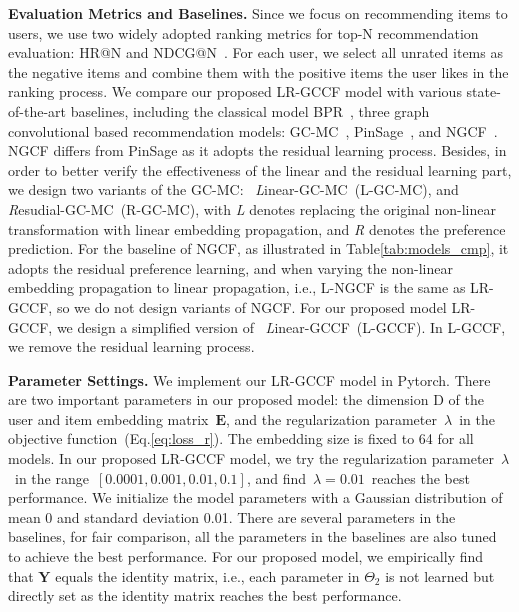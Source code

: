 \documentclass[letterpaper]{article} %
\newcommand{\Mat}[1]{\mathbf{#1}}
\begin{document}
\textbf{Evaluation Metrics and Baselines.}
Since we focus on recommending items to users, we use two widely adopted ranking metrics for top-N recommendation evaluation: HR@N and NDCG@N~\cite{chen2017attentive}. For each user, we select all unrated items as the negative items and combine them with the positive items the user likes in the ranking process. We compare our proposed LR-GCCF model with various state-of-the-art baselines, including the classical model BPR~\cite{UAI2009bpr}, three graph convolutional based recommendation models: GC-MC~\cite{ICLR2017graph}, PinSage~\cite{kdd2018Pinsage}, and NGCF~\cite{sigir2019ngcf}. NGCF differs from PinSage as it adopts the residual learning process.
Besides, in order to better verify the effectiveness of the linear and the residual learning part, we design two variants of the GC-MC: ~\emph{L}inear-GC-MC~(L-GC-MC), and \emph{R}esudial-GC-MC~(R-GC-MC), with \emph{L} denotes replacing the original non-linear transformation with linear embedding propagation, and \emph{R} denotes the preference prediction. For the baseline of NGCF, as illustrated in  Table\ref{tab:models_cmp}, it adopts the residual preference learning, and when varying the non-linear embedding propagation to linear propagation, i.e., L-NGCF is the same as LR-GCCF, so we do not design variants of NGCF. For our proposed model LR-GCCF, we design a simplified version of ~\emph{L}inear-GCCF~(L-GCCF). In L-GCCF, we remove the residual learning process.

 

 

\textbf{Parameter Settings.} We implement our LR-GCCF model in Pytorch. There are two important parameters in our proposed model: the dimension D of the user and item embedding matrix~$\Mat{E}$, and the regularization parameter~$\lambda$~in the objective function~(Eq.\ref{eq:loss_r}). The embedding size is fixed to 64 for all models. In our proposed LR-GCCF model, we try the regularization parameter~$\lambda$~in the range~$[0.0001, 0.001, 0.01, 0.1]$,
and find~$\lambda=0.01$~reaches the best performance. We initialize the model parameters with a Gaussian distribution of mean 0 and standard deviation 0.01. There are several parameters in the baselines, for fair comparison, all the parameters in the baselines are also tuned to achieve the best performance.  For our proposed model, we empirically find that $\Mat{Y}$ equals the identity matrix, i.e., each parameter in $\Theta_2$ is not learned but directly set as the identity matrix reaches the best performance.
\end{document}
